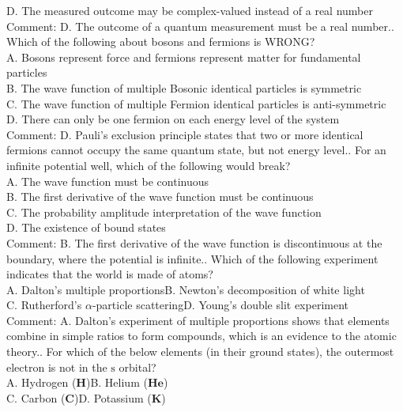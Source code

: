 \documentclass[12pt]{book} %
\numberwithin{equation}{chapter}
\def\a{\alpha}
\def\mc{\hspace{0.5cm}}
\begin{document}
D. The measured outcome may be complex-valued instead of a real number\\
Comment: D. The outcome of a quantum measurement must be a real number.\bigskip{}. Which of the following about bosons and fermions is WRONG?\\
A. Bosons represent force and fermions represent matter for fundamental particles\\
B. The wave function of multiple Bosonic identical particles is symmetric\\
C. The wave function of multiple Fermion identical particles is anti-symmetric\\
D. There can only be one fermion on each energy level of the system\\
Comment: D. Pauli's exclusion principle states that two or more identical fermions cannot occupy the same quantum state, but not energy level.\bigskip{}. For an infinite potential well, which of the following would break?\\
A. The wave function must be continuous\\
B. The first derivative of the wave function must be continuous\\
C. The probability amplitude interpretation of the wave function\\
D. The existence of bound states\\
Comment: B. The first derivative of the wave function is discontinuous at the boundary, where the potential is infinite.\bigskip{}. Which of the following experiment indicates that the world is made of atoms?\\
A. Dalton's multiple proportions\mc B. Newton's decomposition of white light\\
C. Rutherford's $\a$-particle scattering\mc D. Young's double slit experiment\\
Comment: A. Dalton's experiment of multiple proportions shows that elements combine in simple ratios to form compounds, which is an evidence to the atomic theory.\bigskip{}. For which of the below elements (in their ground states), the outermost electron is not in the $\text{s}$ orbital?\\
A. Hydrogen ($\mathbf{H}$)\mc B. Helium ($\mathbf{He}$)\\
C. Carbon ($\mathbf{C}$)\mc D. Potassium ($\mathbf{K}$)\\
\end{document}
